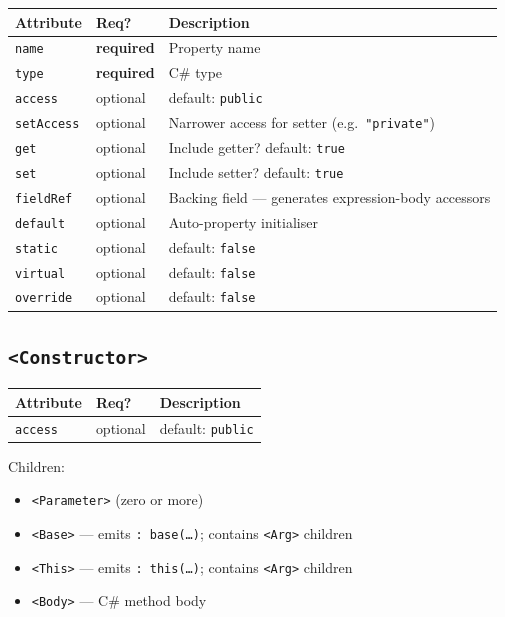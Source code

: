 \documentclass[11pt,a4paper]{article}
\newcommand{\el}[1]{\texttt{\textcolor{xoop-keyword}{<#1>}}}
\newcommand{\attr}[1]{\texttt{\textcolor{xoop-attr}{#1}}}
\newcommand{\val}[1]{\texttt{\textcolor{xoop-string}{"#1"}}}
\newcommand{\cs}[1]{\texttt{#1}}
\newcommand{\required}{\textcolor{xoop-red}{\textbf{required}}}
\newcommand{\optional}{\textcolor{xoop-green}{optional}}
\newcommand{\default}[1]{\textcolor{xoop-green}{default: \texttt{#1}}}
\begin{document}
\begin{center}
\begin{tabularx}{\linewidth}{llX}
\toprule
Attribute & Req? & Description \\
\midrule
\attr{name}      & \required & Property name \\
\attr{type}      & \required & C\# type \\
\attr{access}    & \optional & \default{public} \\
\attr{setAccess} & \optional & Narrower access for setter (e.g.\ \val{private}) \\
\attr{get}       & \optional & Include getter? \default{true} \\
\attr{set}       & \optional & Include setter? \default{true} \\
\attr{fieldRef}  & \optional & Backing field — generates expression-body accessors \\
\attr{default}   & \optional & Auto-property initialiser \\
\attr{static}    & \optional & \default{false} \\
\attr{virtual}   & \optional & \default{false} \\
\attr{override}  & \optional & \default{false} \\
\bottomrule
\end{tabularx}
\end{center}

\subsection{\el{Constructor}}

\begin{center}
\begin{tabularx}{\linewidth}{llX}
\toprule
Attribute & Req? & Description \\
\midrule
\attr{access} & \optional & \default{public} \\
\bottomrule
\end{tabularx}
\end{center}

Children:
\begin{itemize}[nosep]
  \item \el{Parameter} (zero or more)
  \item \el{Base} — emits \cs{: base(\ldots)}; contains \el{Arg} children
  \item \el{This} — emits \cs{: this(\ldots)}; contains \el{Arg} children
  \item \el{Body} — C\# method body
\end{itemize}
\end{document}
